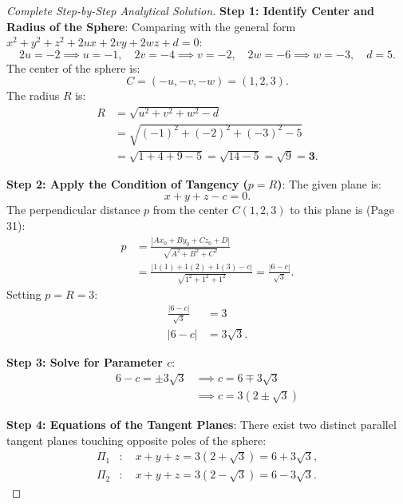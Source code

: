 \begin{proof}[Complete Step-by-Step Analytical Solution]
\textbf{Step 1: Identify Center and Radius of the Sphere}:
Comparing with the general form $x^2 + y^2 + z^2 + 2ux + 2vy + 2wz + d = 0$:
\begin{equation}
    2u = -2 \implies u = -1, \quad 2v = -4 \implies v = -2, \quad 2w = -6 \implies w = -3, \quad d = 5.
\end{equation}
The center of the sphere is:
\begin{equation}
    C = (-u, -v, -w) = (1, 2, 3).
\end{equation}
The radius $R$ is:
\begin{align}
    R &= \sqrt{u^2 + v^2 + w^2 - d} \nonumber\\
    &= \sqrt{(-1)^2 + (-2)^2 + (-3)^2 - 5} \nonumber\\
    &= \sqrt{1 + 4 + 9 - 5} = \sqrt{14 - 5} = \sqrt{9} = \mathbf{3}.
\end{align}

\textbf{Step 2: Apply the Condition of Tangency ($p = R$)}:
The given plane is:
\begin{equation}
    x + y + z - c = 0.
\end{equation}
The perpendicular distance $p$ from the center $C(1, 2, 3)$ to this plane is (Page 31):
\begin{align}
    p &= \frac{|Ax_0 + By_0 + Cz_0 + D|}{\sqrt{A^2 + B^2 + C^2}} \nonumber\\
    &= \frac{|1(1) + 1(2) + 1(3) - c|}{\sqrt{1^2 + 1^2 + 1^2}} = \frac{|6 - c|}{\sqrt{3}}.
\end{align}
Setting $p = R = 3$:
\begin{align}
    \frac{|6 - c|}{\sqrt{3}} &= 3 \nonumber\\
    |6 - c| &= 3\sqrt{3}.
\end{align}

\textbf{Step 3: Solve for Parameter $c$}:
\begin{align}
    6 - c = \pm 3\sqrt{3} &\implies c = 6 \mp 3\sqrt{3} \nonumber\\
    &\implies \boxed{c = 3(2 \pm \sqrt{3})}
\end{align}

\textbf{Step 4: Equations of the Tangent Planes}:
There exist two distinct parallel tangent planes touching opposite poles of the sphere:
\begin{align}
    \Pi_1 &: \quad \boxed{x + y + z = 3(2 + \sqrt{3}) = 6 + 3\sqrt{3}}, \\
    \Pi_2 &: \quad \boxed{x + y + z = 3(2 - \sqrt{3}) = 6 - 3\sqrt{3}}.
\end{align}
\end{proof}

